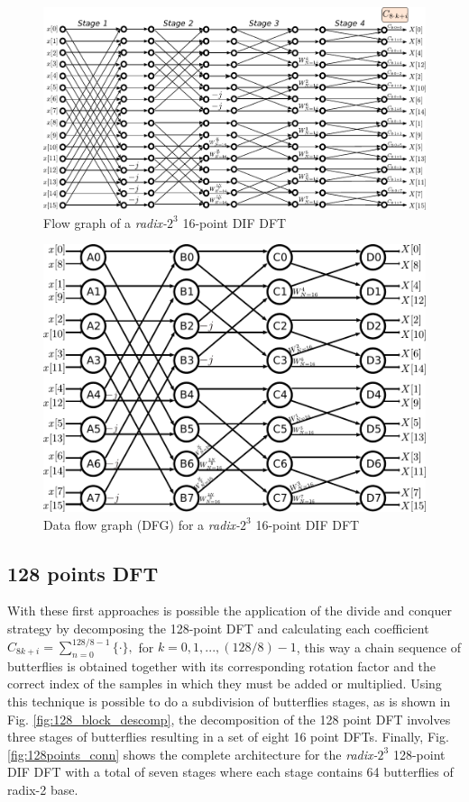 \documentclass[journal,comsoc]{IEEEtran}
\begin{document}
\begin{figure} [ht]
	\centering
	\includegraphics[width=\linewidth]{Diagramas/miSeccionFiguras/16PuntosRadix8Conexion.pdf}
	\caption{Flow graph of a \textit{radix-}$2^3$ 16-point DIF DFT}
	\label{fig:16points_df}
\end{figure}

\begin{figure} [ht]
	\centering
	\includegraphics[width=\linewidth]{Diagramas/miSeccionFiguras/16PuntosRadix8Burbujas.pdf}
	\caption{Data flow graph (DFG) for a \textit{radix-}$2^3$ 16-point DIF DFT}
	\label{fig:16points_dfg}
\end{figure}

\subsection{128 points DFT}
With these first approaches is possible the application of the divide and conquer strategy by decomposing the 128-point DFT and calculating each coefficient $C_{8k+i} = \sum_{n=0}^{128/8-1} \{ \cdot \}, $ for $k=0,1,...,(128/8)-1$, this way a  chain sequence of butterflies is obtained together with its corresponding rotation factor and the correct index of the samples in which they must be added or multiplied. Using this technique is possible to do a subdivision of butterflies stages, as is shown in Fig. \ref{fig:128_block_descomp}, the decomposition of the 128 point DFT involves three stages of butterflies resulting in a set of eight 16 point DFTs. Finally, Fig. \ref{fig:128points_conn} shows the complete architecture for the  \textit{radix-}$2^3$ 128-point DIF DFT with a total of seven stages where each stage  contains 64 butterflies of radix-2 base.
\end{document}
